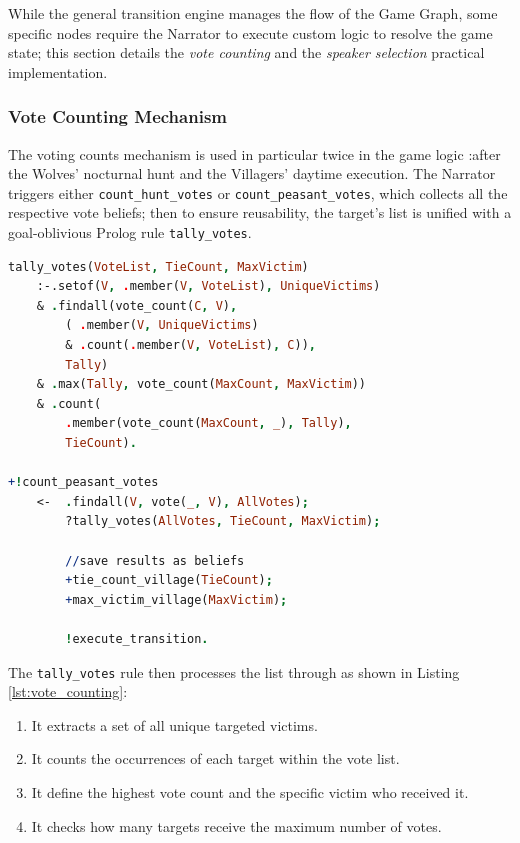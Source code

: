 While the general transition engine manages the flow of the Game Graph, some specific nodes require the Narrator to execute custom logic to resolve the game state; this section details the \emph{vote counting} and the \emph{speaker selection} practical implementation.

\subsubsection{Vote Counting Mechanism}
The voting counts mechanism is used in particular twice in the game logic :after  the Wolves' nocturnal hunt and the Villagers' daytime execution.
The Narrator triggers either \texttt{count\_hunt\_votes} or \texttt{count\_peasant\_votes}, which collects all the respective vote beliefs; then to ensure reusability, the target's list is unified with a goal-oblivious Prolog rule \texttt{tally\_votes}.


\vspace{1em}
\begin{lstlisting}[frame=single, language=Prolog, caption={The unified vote counting logic and the \emph{Peasant vote} resolution plan; after the count, \texttt{tie\_count\_village(TieCount)} indicates if the vote was a tie, and \texttt{max\_victim\_village(MaxVictim)} defines the eventual victim of the vote.}, label={lst:vote_counting}]
tally_votes(VoteList, TieCount, MaxVictim)  
    :-.setof(V, .member(V, VoteList), UniqueVictims)          
    & .findall(vote_count(C, V),
        ( .member(V, UniqueVictims) 
        & .count(.member(V, VoteList), C)), 
        Tally)
    & .max(Tally, vote_count(MaxCount, MaxVictim))            
    & .count(
        .member(vote_count(MaxCount, _), Tally), 
        TieCount). 

+!count_peasant_votes
    <-  .findall(V, vote(_, V), AllVotes);
        ?tally_votes(AllVotes, TieCount, MaxVictim);
        
        //save results as beliefs
        +tie_count_village(TieCount); 
        +max_victim_village(MaxVictim);
        
        !execute_transition.
\end{lstlisting}

The \texttt{tally\_votes} rule then processes the list through as shown in Listing \ref{lst:vote_counting}:
\begin{enumerate}
    \item It extracts a set of all unique targeted victims.
    \item It counts the occurrences of each target within the vote list.
    \item It define the highest vote count and the specific victim who received it.
    \item It checks how many targets receive the maximum number of votes.
\end{enumerate}

